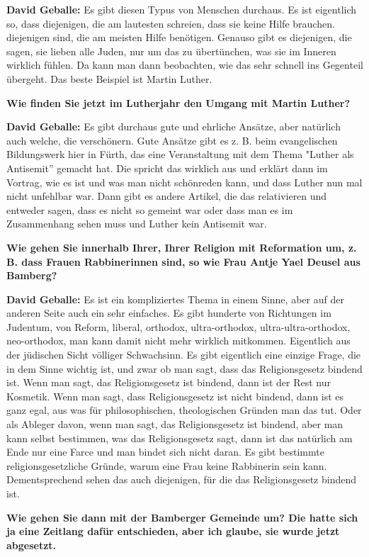 \textbf{David Geballe:} Es gibt diesen Typus von Menschen durchaus. Es ist eigentlich so, dass diejenigen, die am lautesten schreien, dass sie keine Hilfe brauchen. diejenigen sind, die am meisten Hilfe benötigen. Genauso gibt es diejenigen, die sagen, sie lieben alle Juden, nur um das zu übertünchen, was sie im Inneren wirklich fühlen. Da kann man dann beobachten, wie das sehr schnell ins Gegenteil übergeht. Das beste Beispiel ist Martin Luther. 

\textbf{Wie finden Sie jetzt im Lutherjahr den Umgang mit Martin Luther?} 

\textbf{David Geballe:} Es gibt durchaus gute und ehrliche Ansätze, aber natürlich auch welche, die verschönern. Gute Ansätze gibt es z. B. beim evangelischen Bildungswerk hier in Fürth, das eine Veranstaltung mit dem Thema "Luther als Antisemit” gemacht hat. Die spricht das wirklich aus und erklärt dann im Vortrag, wie es ist und was man nicht schönreden kann, und dass Luther nun mal nicht unfehlbar war. Dann gibt es andere Artikel, die das relativieren und entweder sagen, dass es nicht so gemeint war oder dass man es im Zusammenhang sehen muss und Luther kein Antisemit war. 

\textbf{Wie gehen Sie innerhalb Ihrer, Ihrer Religion mit Reformation um, z. B. dass Frauen Rabbinerinnen sind, so wie Frau Antje Yael Deusel aus Bamberg?} 

\textbf{David Geballe:} Es ist ein kompliziertes Thema in einem Sinne, aber auf der anderen Seite auch ein sehr einfaches. Es gibt hunderte von Richtungen im Judentum, von Reform, liberal, orthodox, ultra-orthodox, ultra-ultra-orthodox, neo-orthodox, man kann damit nicht mehr wirklich mitkommen. Eigentlich aus der jüdischen Sicht völliger Schwachsinn. Es gibt eigentlich eine einzige Frage, die in dem Sinne wichtig ist, und zwar ob man sagt, dass das Religionsgesetz bindend ist. 
Wenn man sagt, das Religionsgesetz ist bindend, dann ist der Rest nur Kosmetik. Wenn man sagt, dass Religionsgesetz ist nicht bindend, dann ist es ganz egal, aus was für philosophischen, theologischen Gründen man das tut. Oder als Ableger davon, wenn man sagt, das Religionsgesetz ist bindend, aber man kann selbst bestimmen, was das Religionsgesetz sagt, dann ist das natürlich am Ende nur eine Farce und man bindet sich nicht daran. Es gibt bestimmte religionsgesetzliche Gründe, warum eine Frau keine Rabbinerin sein kann. Dementsprechend sehen das auch diejenigen, für die das Religionsgesetz bindend ist. 

\textbf{Wie gehen Sie dann mit der Bamberger Gemeinde um? Die hatte sich ja eine Zeitlang dafür entschieden, aber ich glaube, sie wurde jetzt abgesetzt.} 

